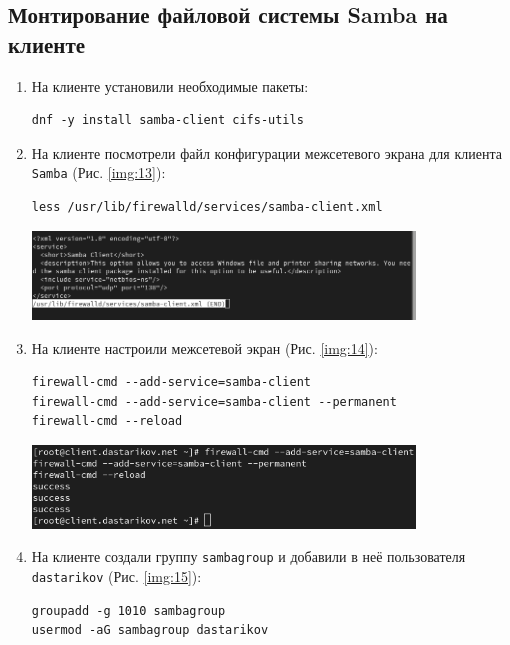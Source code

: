 \subsection{Монтирование файловой системы Samba на клиенте}
\begin{enumerate}
\item На клиенте установили необходимые пакеты:
    \begin{verbatim}
dnf -y install samba-client cifs-utils
    \end{verbatim}
\item На клиенте посмотрели файл конфигурации межсетевого экрана для клиента {\tt Samba} (Рис. \ref{img:13}):
\begin{verbatim}
less /usr/lib/firewalld/services/samba-client.xml
\end{verbatim}

\begin{center}
    \centering
    \includegraphics[width=0.8\textwidth]{../images/image13.png}
    \label{img:13}
\end{center}

\item На клиенте настроили межсетевой экран (Рис. \ref{img:14}):
    \begin{verbatim}
firewall-cmd --add-service=samba-client
firewall-cmd --add-service=samba-client --permanent
firewall-cmd --reload
    \end{verbatim}

\begin{center}
    \centering
    \includegraphics[width=0.8\textwidth]{../images/image14.png}
    \label{img:14}
\end{center}

\item На клиенте создали группу {\tt sambagroup} и добавили в неё пользователя {\tt dastarikov} (Рис. \ref{img:15}):
    \begin{verbatim}
groupadd -g 1010 sambagroup
usermod -aG sambagroup dastarikov
    \end{verbatim}


\end{enumerate}

